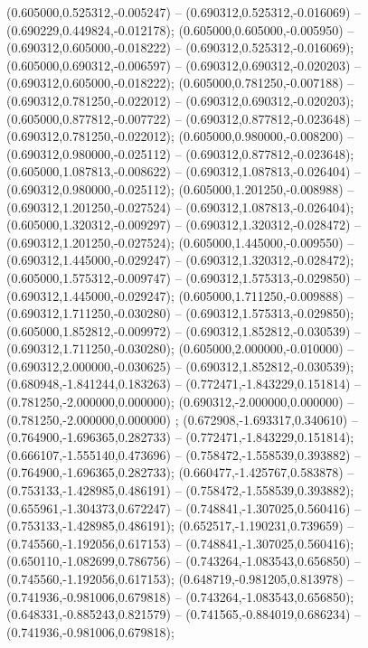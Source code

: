  (0.605000,0.525312,-0.005247) -- (0.690312,0.525312,-0.016069) -- (0.690229,0.449824,-0.012178);
 (0.605000,0.605000,-0.005950) -- (0.690312,0.605000,-0.018222) -- (0.690312,0.525312,-0.016069);
 (0.605000,0.690312,-0.006597) -- (0.690312,0.690312,-0.020203) -- (0.690312,0.605000,-0.018222);
 (0.605000,0.781250,-0.007188) -- (0.690312,0.781250,-0.022012) -- (0.690312,0.690312,-0.020203);
 (0.605000,0.877812,-0.007722) -- (0.690312,0.877812,-0.023648) -- (0.690312,0.781250,-0.022012);
 (0.605000,0.980000,-0.008200) -- (0.690312,0.980000,-0.025112) -- (0.690312,0.877812,-0.023648);
 (0.605000,1.087813,-0.008622) -- (0.690312,1.087813,-0.026404) -- (0.690312,0.980000,-0.025112);
 (0.605000,1.201250,-0.008988) -- (0.690312,1.201250,-0.027524) -- (0.690312,1.087813,-0.026404);
 (0.605000,1.320312,-0.009297) -- (0.690312,1.320312,-0.028472) -- (0.690312,1.201250,-0.027524);
 (0.605000,1.445000,-0.009550) -- (0.690312,1.445000,-0.029247) -- (0.690312,1.320312,-0.028472);
 (0.605000,1.575312,-0.009747) -- (0.690312,1.575313,-0.029850) -- (0.690312,1.445000,-0.029247);
 (0.605000,1.711250,-0.009888) -- (0.690312,1.711250,-0.030280) -- (0.690312,1.575313,-0.029850);
 (0.605000,1.852812,-0.009972) -- (0.690312,1.852812,-0.030539) -- (0.690312,1.711250,-0.030280);
 (0.605000,2.000000,-0.010000) -- (0.690312,2.000000,-0.030625) -- (0.690312,1.852812,-0.030539);
 (0.680948,-1.841244,0.183263) -- (0.772471,-1.843229,0.151814) -- (0.781250,-2.000000,0.000000);
 (0.690312,-2.000000,0.000000) -- (0.781250,-2.000000,0.000000) ;
 (0.672908,-1.693317,0.340610) -- (0.764900,-1.696365,0.282733) -- (0.772471,-1.843229,0.151814);
 (0.666107,-1.555140,0.473696) -- (0.758472,-1.558539,0.393882) -- (0.764900,-1.696365,0.282733);
 (0.660477,-1.425767,0.583878) -- (0.753133,-1.428985,0.486191) -- (0.758472,-1.558539,0.393882);
 (0.655961,-1.304373,0.672247) -- (0.748841,-1.307025,0.560416) -- (0.753133,-1.428985,0.486191);
 (0.652517,-1.190231,0.739659) -- (0.745560,-1.192056,0.617153) -- (0.748841,-1.307025,0.560416);
 (0.650110,-1.082699,0.786756) -- (0.743264,-1.083543,0.656850) -- (0.745560,-1.192056,0.617153);
 (0.648719,-0.981205,0.813978) -- (0.741936,-0.981006,0.679818) -- (0.743264,-1.083543,0.656850);
 (0.648331,-0.885243,0.821579) -- (0.741565,-0.884019,0.686234) -- (0.741936,-0.981006,0.679818);
